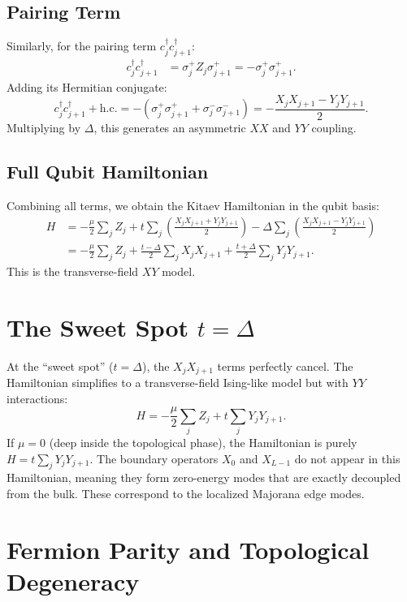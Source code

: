 \documentclass[11pt]{article}
\begin{document}
\subsection{Pairing Term}
Similarly, for the pairing term $c_j^\dagger c_{j+1}^\dagger$:
\begin{align*}
  c_j^\dagger c_{j+1}^\dagger 
  &= \sigma_j^+ Z_j \sigma_{j+1}^+ = - \sigma_j^+ \sigma_{j+1}^+.
\end{align*}
Adding its Hermitian conjugate:
\begin{equation}
  c_j^\dagger c_{j+1}^\dagger + \text{h.c.} = - (\sigma_j^+ \sigma_{j+1}^+ + \sigma_j^- \sigma_{j+1}^-) = - \frac{X_j X_{j+1} - Y_j Y_{j+1}}{2}.
\end{equation}
Multiplying by $\Delta$, this generates an asymmetric $XX$ and $YY$ coupling.

\subsection{Full Qubit Hamiltonian}
Combining all terms, we obtain the Kitaev Hamiltonian in the qubit basis:
\begin{align}
  H &= -\frac{\mu}{2} \sum_j Z_j 
      + t \sum_j \left( \frac{X_j X_{j+1} + Y_j Y_{j+1}}{2} \right)
      - \Delta \sum_j \left( \frac{X_j X_{j+1} - Y_j Y_{j+1}}{2} \right) \nonumber \\
    &= -\frac{\mu}{2} \sum_j Z_j 
      + \frac{t - \Delta}{2} \sum_j X_j X_{j+1} 
      + \frac{t + \Delta}{2} \sum_j Y_j Y_{j+1}.
\end{align}
This is the transverse-field $XY$ model. 

\section{The Sweet Spot $t = \Delta$}
At the ``sweet spot'' ($t=\Delta$), the $X_j X_{j+1}$ terms perfectly cancel. The Hamiltonian simplifies to a transverse-field Ising-like model but with $YY$ interactions:
\begin{equation}
  H = -\frac{\mu}{2} \sum_j Z_j + t \sum_j Y_j Y_{j+1}.
\end{equation}
If $\mu=0$ (deep inside the topological phase), the Hamiltonian is purely $H = t \sum_j Y_j Y_{j+1}$. The boundary operators $X_0$ and $X_{L-1}$ do not appear in this Hamiltonian, meaning they form zero-energy modes that are exactly decoupled from the bulk. These correspond to the localized Majorana edge modes.

\section{Fermion Parity and Topological Degeneracy}
\end{document}

